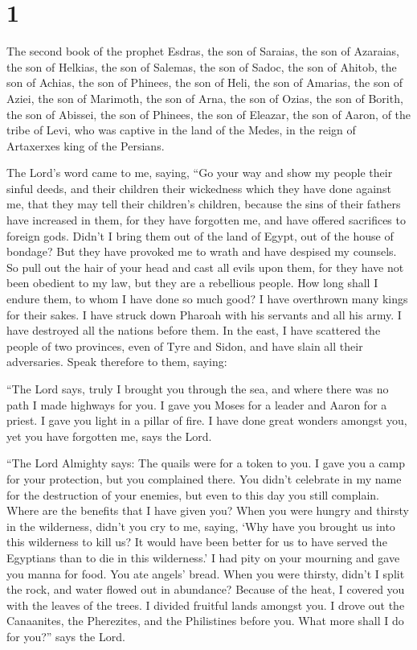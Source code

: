 \hypertarget{section}{%
\section{1}\label{section}}

 The second book of the prophet Esdras, the son of Saraias,
the son of Azaraias, the son of Helkias, the son of Salemas, the son of
Sadoc, the son of Ahitob,  the son of Achias, the son of
Phinees, the son of Heli, the son of Amarias, the son of Aziei, the son
of Marimoth, the son of Arna, the son of Ozias, the son of Borith, the
son of Abissei, the son of Phinees, the son of Eleazar,  the
son of Aaron, of the tribe of Levi, who was captive in the land of the
Medes, in the reign of Artaxerxes king of the Persians.

 The Lord's word came to me, saying,  ``Go your
way and show my people their sinful deeds, and their children their
wickedness which they have done against me, that they may tell their
children's children,  because the sins of their fathers have
increased in them, for they have forgotten me, and have offered
sacrifices to foreign gods.  Didn't I bring them out of the
land of Egypt, out of the house of bondage? But they have provoked me to
wrath and have despised my counsels.  So pull out the hair
of your head and cast all evils upon them, for they have not been
obedient to my law, but they are a rebellious people.  How
long shall I endure them, to whom I have done so much good?
 I have overthrown many kings for their sakes. I have
struck down Pharoah with his servants and all his army.  I
have destroyed all the nations before them. In the east, I have
scattered the people of two provinces, even of Tyre and Sidon, and have
slain all their adversaries.  Speak therefore to them,
saying:

 ``The Lord says, truly I brought you through the sea, and
where there was no path I made highways for you. I gave you Moses for a
leader and Aaron for a priest.  I gave you light in a
pillar of fire. I have done great wonders amongst you, yet you have
forgotten me, says the Lord.

 ``The Lord Almighty says: The quails were for a token to
you. I gave you a camp for your protection, but you complained there.
 You didn't celebrate in my name for the destruction of
your enemies, but even to this day you still complain. 
Where are the benefits that I have given you? When you were hungry and
thirsty in the wilderness, didn't you cry to me,  saying,
`Why have you brought us into this wilderness to kill us? It would have
been better for us to have served the Egyptians than to die in this
wilderness.'  I had pity on your mourning and gave you
manna for food. You ate angels' bread.  When you were
thirsty, didn't I split the rock, and water flowed out in abundance?
Because of the heat, I covered you with the leaves of the trees.
 I divided fruitful lands amongst you. I drove out the
Canaanites, the Pherezites, and the Philistines before you. What more
shall I do for you?'' says the Lord.

